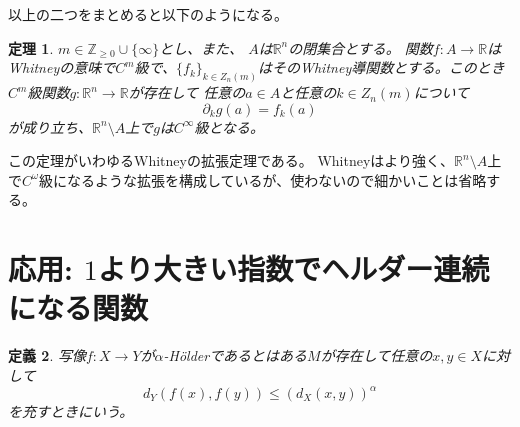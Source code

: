 \documentclass[leqno]{jsarticle}
\newtheorem{thm}{定理}
\newtheorem{df}[thm]{定義}
\newcommand{\zz}{\mathbb{Z}}
\newcommand{\rr}{\mathbb{R}}
\begin{document}


以上の二つをまとめると以下のようになる。
\begin{thm}
$m\in \zz_{\ge 0}\cup \{\infty\}$とし、また、
$A$は$\rr^n$の閉集合とする。
関数$f:A\to \rr$はWhitneyの意味で$C^m$級で、$\{f_k\}_{k\in Z_n(m)}$はそのWhitney導関数とする。このとき$C^m$級関数$g:\rr^n\to \rr$が存在して
任意の$a\in A$と任意の$k\in Z_n(m)$について
\[
\partial_kg(a)=f_k(a)
\]
が成り立ち、$\rr^n\setminus A$上で$g$は$C^{\infty}$級となる。
\end{thm}
この定理がいわゆるWhitneyの拡張定理である。
Whitneyはより強く、$\rr^n\setminus A$上で$C^{\omega}$級になるような拡張を構成しているが、使わないので細かいことは省略する。


\section{応用: $1$より大きい指数でヘルダー連続になる関数}
\begin{df}
写像$f:X\to Y$が$\alpha$-H\"olderであるとはある$M$が存在して任意の$x,y\in X$に対して
\[
d_Y(f(x),f(y))\le (d_X(x,y))^{\alpha}
\]
を充すときにいう。
\end{df}
\end{document}
